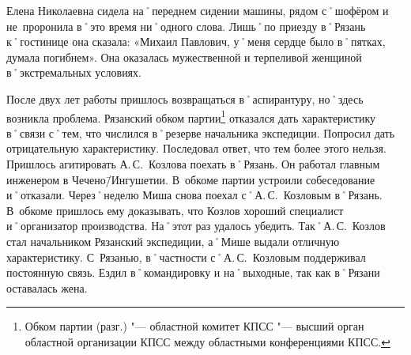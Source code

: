 Елена Николаевна сидела на˚переднем сидении машины, рядом с˚шофёром и не~проронила в˚это время ни˚одного слова. Лишь˚по приезду в˚Рязань к˚гостинице она сказала: «Михаил Павлович, у˚меня сердце было в˚пятках, думала погибнем». Она оказалась мужественной и терпеливой женщиной в˚экстремальных условиях.

После двух лет работы пришлось возвращаться в˚аспирантуру, но˚здесь возникла проблема. Рязанский обком партии\footnote{Обком партии (разг.) "--- областной комитет КПСС "--- высший орган областной организации КПСС между областными конференциями КПСС.} отказался дать характеристику в˚связи с˚тем, что числился в˚резерве начальника экспедиции. Попросил дать отрицательную характеристику. Последовал ответ, что тем более этого нельзя. Пришлось агитировать А.\,С.~Козлова поехать в˚Рязань. Он работал главным инженером в Чечено\=/Ингушетии. В~обкоме партии устроили собеседование и˚отказали. Через˚неделю Миша снова поехал с˚А.\,С.~Козловым в˚Рязань. В~обкоме пришлось ему доказывать, что Козлов хороший специалист и˚организатор производства. На˚этот раз удалось убедить. Так˚А.\,С.~Козлов стал начальником Рязанский экспедиции, а˚Мише выдали отличную характеристику. С~Рязанью, в˚частности с˚А.\,С.~Козловым поддерживал постоянную связь. Ездил в˚командировку и на˚выходные, так как в˚Рязани оставалась жена. 
